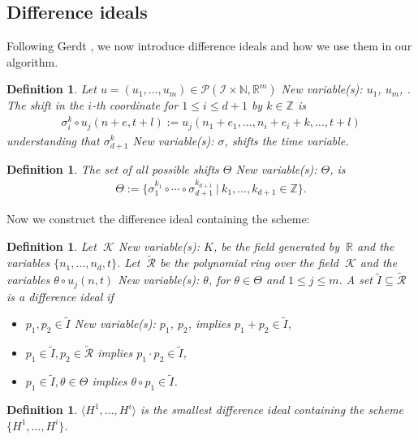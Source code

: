 \documentclass[sigconf,twocolumn]{acmart}
\newcommand{\1}{{\chi}}
\numberwithin{equation}{section}
\theoremstyle{thmlemcorr}
\numberwithin{theorem}{section}
\theoremstyle{thmlemcorr*}
\theoremstyle{defi}
\newtheorem{definition}[theorem]{Definition}
\theoremstyle{remexample}
\theoremstyle{ass}
\begin{document}
\subsection*{Difference ideals}\label{diffid}
Following Gerdt \cite{gerdt12}, we now introduce difference ideals and how we use them in our algorithm.
\begin{definition}
	Let \(u=(u_1,\dots,u_m)\in\mathcal{P}({\mathcal{I}}\times{\mathbb{N}},{\mathbb{R}}^m)\)
{\color{blue} New variable(s): \(u_1\), \(u_m\),  }
. The shift in the \(i\)-th coordinate for \(1\leq i\leq d+1\) by \(k\in{\mathbb{Z}}\) is
	\begin{gather*}
		\sigma_i^k\circ u_j(n+e,t+l):=u_j(n_1+e_1,\ldots,n_i+e_i+k,\ldots,t+l)
	\end{gather*}
	understanding that \(\sigma_{d+1}^k\)
{\color{blue} New variable(s): \(\sigma\),  }
 shifts the time variable.
\end{definition}
\begin{definition}
	The set of all possible shifts \(\Theta\)
{\color{blue} New variable(s): \(\Theta\),  }
 is
	\begin{gather*}
		\Theta:=\{\sigma_1^{k_1}\circ\cdots\circ\sigma_{d+1}^{k_{d+1}}\ |\ k_1,\ldots,k_{d+1}\in{\mathbb{Z}}\}.
	\end{gather*}
\end{definition}
Now we construct the difference ideal containing the scheme:
\begin{definition}
	\label{diffideal}
	Let \(\ \mathcal{K}\)
{\color{blue} New variable(s): \(K\),  }
 be the field generated by \(\ {\mathbb{R}}\) and the variables \(\{n_1,\ldots,n_d,t\}\). Let \(\ \tilde{\mathcal{R}}\) be the polynomial ring over the field \(\ \mathcal{K}\) and the variables \(\theta\circ u_j(n,t)\)
{\color{blue} New variable(s): \(\theta\),  }
 for \(\theta\in\Theta\) and \(1\leq j\leq m\).
	A set \(\tilde{I}\subseteq\tilde{\mathcal{R}}\) is a difference ideal if
	\begin{itemize}
		\item \(p_1,p_2\in\tilde{I}\)
{\color{blue} New variable(s): \(p_1\), \(p_2\),  }
 implies \(p_1+p_2\in\tilde{I}\),
		\item \(p_1\in\tilde{I},p_2\in\tilde{\mathcal{R}}\) implies \(p_1\cdot p_2\in\tilde{I}\),
		\item \(p_1\in\tilde{I},\theta\in\Theta\) implies \(\theta\circ p_1\in\tilde{I}\).
	\end{itemize}
\end{definition}
\begin{definition}
	\(\langle H^1,\ldots,H^i\rangle\) is the smallest difference ideal containing the scheme \(\{H^1,\ldots,H^i\}\).
\end{definition}
\end{document}
